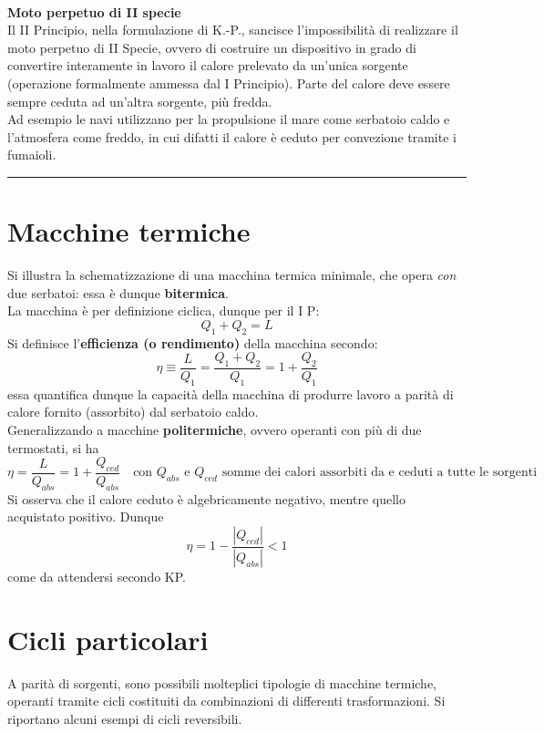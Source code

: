 \documentclass[10pt, oneside]{book}
\newcommand{\infobox}[2]{\vspace{0.5cm}~\\ \textbf{#1} \hrulefill \vspace{0.2cm}\\#2 {}\,\\\hrule \vspace{0.5cm}}
\begin{document}
\infobox{Moto perpetuo di II specie}{Il II Principio, nella formulazione di K.-P., sancisce l'impossibilità di realizzare il moto perpetuo di II Specie, ovvero di costruire un dispositivo in grado di convertire interamente in lavoro il calore prelevato da un'unica sorgente (operazione formalmente ammessa dal I Principio). Parte del calore deve essere sempre ceduta ad un'altra sorgente, più fredda.\\
Ad esempio le navi utilizzano per la propulsione il mare come serbatoio caldo e l'atmosfera come freddo, in cui difatti il calore è ceduto per convezione tramite i fumaioli.}

\section{Macchine termiche}
Si illustra la schematizzazione di una macchina termica minimale, che opera \textit{con} due serbatoi: essa è dunque \textbf{bitermica}.\\
La macchina è per definizione ciclica, dunque per il I P:
\[Q_1 + Q_2 = L\]
Si definisce l'\textbf{efficienza (o rendimento)} della macchina secondo:
\[\eta \equiv \frac{L}{Q_1} = \frac{Q_1 + Q_2}{Q_1} = 1 + \frac{Q_2}{Q_1}\]
essa quantifica dunque la capacità della macchina di produrre lavoro a parità di calore fornito (assorbito) dal serbatoio caldo.\\
Generalizzando a macchine \textbf{politermiche}, ovvero operanti con più di due termostati, si ha
\[\eta = \frac{L}{Q_{abs}} = 1 + \frac{Q_{ced}}{Q_{abs}} \quad \textrm{con $Q_{abs}$ e $Q_{ced}$ somme dei calori assorbiti da e ceduti a tutte le sorgenti}\]
Si osserva che il calore ceduto è algebricamente negativo, mentre quello acquistato positivo. Dunque 
\[\eta = 1 - \frac{|Q_{ced}|}{|Q_{abs}|} < 1\]
come da attendersi secondo KP.

\section{Cicli particolari}
A parità di sorgenti, sono possibili molteplici tipologie di macchine termiche, operanti tramite cicli costituiti da combinazioni di differenti trasformazioni. Si riportano alcuni esempi di cicli reversibili.
\end{document}
